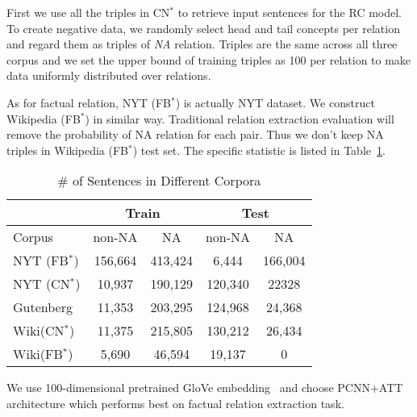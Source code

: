 First we use all the triples in CN$^*$ to retrieve input sentences for the
RC model. 
To create negative data, we randomly select head and tail concepts per relation and regard them as triples of \textit{NA} relation. 
Triples are the same across all three corpus and we set the upper bound of training triples as 100 per relation to make data uniformly distributed over relations. 

As for factual relation, NYT (FB$^*$) is actually NYT dataset. 
We construct Wikipedia (FB$^*$) in similar way. 
Traditional relation extraction evaluation will remove the probability of NA relation for each pair. Thus we don't keep NA triples in Wikipedia (FB$^*$) test set.
The specific statistic is listed in Table~\ref{table:sen distribution}.


\begin{table}[h]
	\small
	\centering
	\begin{tabular}{|l|c|c|c|c|}
		\hline
		& \multicolumn{2}{c|}{\textbf{Train}} & \multicolumn{2}{c|}{\textbf{Test}} \\\hline 
		Corpus                & \multicolumn{1}{c|}{non-NA} & \multicolumn{1}{c|}{NA} & \multicolumn{1}{c|}{non-NA} & \multicolumn{1}{c|}{NA} \\ \hline
NYT (FB$^*$)  & 156,664& 413,424& 6,444&166,004\\ \hline		
NYT (CN$^*$)&10,937& 190,129& 120,340& 22328\\ \hline
		Gutenberg             & 11,353                                & 203,295                           & 124,968                               & 24,368                            \\ \hline
		Wiki(CN$^*$)             & 11,375                                 & 215,805                           & 130,212                                & 26,434                             \\ \hline
		Wiki(FB$^*$) & 5,690& 46,594 & 19,137 & 0 \\ \hline
	\end{tabular}
	\caption{\# of Sentences in Different Corpora}
	\label{table:sen distribution}
\end{table}




We use 100-dimensional pretrained GloVe embedding~\cite{pennington2014glove} and choose PCNN+ATT architecture which performs best on factual relation extraction task.





